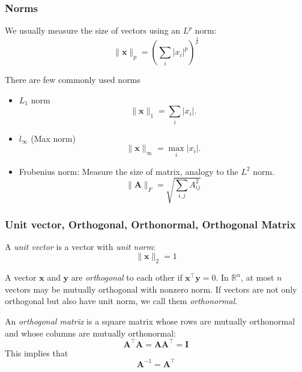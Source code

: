 \documentclass{beamer}
\begin{document}
\begin{frame}
  \frametitle{Norms}

  We usually measure the size of vectors using an $L^{p}$ norm:
  \begin{equation*}
    \|\bm{x}\|_{p}=\left(\sum_{i}|x_{i}|^{p}\right)^{\frac{1}{p}}
  \end{equation*}

  There are few commonly used norms
  \begin{itemize}
    \item $L_{1}$ norm
      \begin{equation*}
        \|\bm{x}\|_{1}=\sum_{i}|x_{i}|.
      \end{equation*}
    \item $l_{\infty}$ (Max norm)
      \begin{equation*}
        \|\bm{x}\|_{\infty}=\max_{i}|x_{i}|.
      \end{equation*}
    \item Frobenius norm: Measure the size of matrix, analogy to the $L^{2}$ norm.
      \begin{equation*}
        \|\bm{A}\|_{F}=\sqrt{\sum\limits_{i,j}A_{ij}^{2}}
      \end{equation*}
  \end{itemize}
\end{frame}

\begin{frame}
  \frametitle{Unit vector, Orthogonal, Orthonormal, Orthogonal Matrix}

  \small

  A \emph{unit vector} is a vector with \emph{unit norm}:
  \begin{equation*}
    \|\bm{x}\|_{2}=1
  \end{equation*}

  A vector $\bm{x}$ and $\bm{y}$ are \emph{orthogonal} to each other if $\bm{x}^{\top}\bm{y}=0$. In $\mathbb{R}^{n}$, at most $n$ vectors may be mutually orthogonal with nonzero norm. If vectors are not only orthogonal but also have unit norm, we call them \emph{orthonormal}.

  An \emph{orthogonal matrix} is a square matrix whose rows are mutually orthonormal and whose columns are mutually orthonormal:
  \begin{equation*}
    \bm{A}^{\top}\bm{A}=\bm{A}\bm{A}^{\top}=\bm{I}
  \end{equation*}
  This implies that
  \begin{equation*}
    \bm{A}^{-1}=\bm{A}^{\top}
  \end{equation*}
\end{frame}
\end{document}
